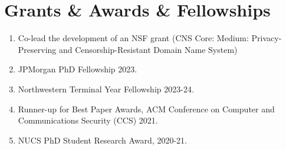 \documentclass[letterpaper,11pt]{article}
\begin{document}
\section{Grants \& Awards \& Fellowships}
\begin{enumerate}[leftmargin=0.20in]
  \item Co-lead the development of an NSF grant (CNS Core: Medium: Privacy-Preserving and Censorship-Resistant Domain Name System)
  \item JPMorgan PhD Fellowship 2023.
  \item Northwestern Terminal Year Fellowship 2023-24.
    \item Runner-up for Best Paper Awards, ACM Conference on Computer and Communications Security (CCS) 2021.
    \item NUCS PhD Student Research Award, 2020-21.
\end{enumerate}



\end{document}
